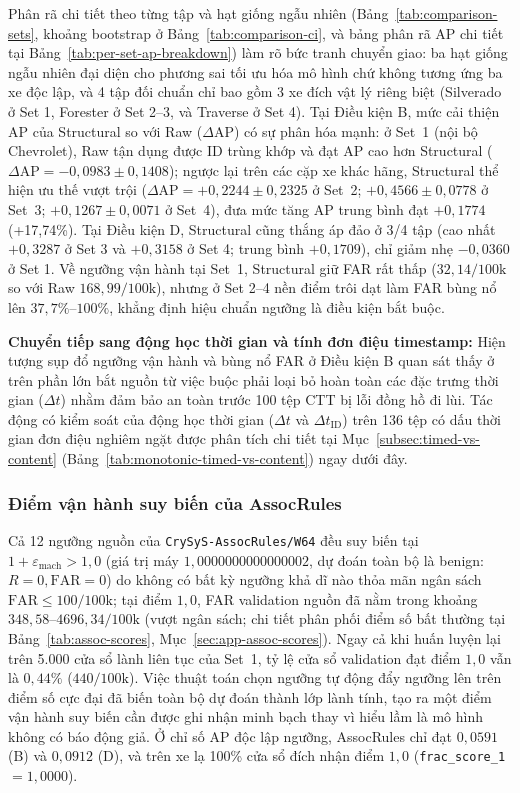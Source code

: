 \documentclass[12pt, a4paper, reqno, oneside]{book}
\DeclareRobustCommand{\code}[1]{\nolinkurl{#1}}
\begin{document}
Phân rã chi tiết theo từng tập và hạt giống ngẫu nhiên (Bảng~\ref{tab:comparison-sets}, khoảng bootstrap ở Bảng~\ref{tab:comparison-ci}, và bảng phân rã AP chi tiết tại Bảng~\ref{tab:per-set-ap-breakdown}) làm rõ bức tranh chuyển giao: ba hạt giống ngẫu nhiên đại diện cho phương sai tối ưu hóa mô hình chứ không tương ứng ba xe độc lập, và 4 tập đối chuẩn chỉ bao gồm 3 xe đích vật lý riêng biệt (Silverado ở Set 1, Forester ở Set 2--3, và Traverse ở Set 4). Tại Điều kiện B, mức cải thiện AP của Structural so với Raw ($\Delta\text{AP}$) có sự phân hóa mạnh: ở Set~1 (nội bộ Chevrolet), Raw tận dụng được ID trùng khớp và đạt AP cao hơn Structural ($\Delta\text{AP} = -0{,}0983 \pm 0{,}1408$); ngược lại trên các cặp xe khác hãng, Structural thể hiện ưu thế vượt trội ($\Delta\text{AP} = +0{,}2244 \pm 0{,}2325$ ở Set~2; $+0{,}4566 \pm 0{,}0778$ ở Set~3; $+0{,}1267 \pm 0{,}0071$ ở Set~4), đưa mức tăng AP trung bình đạt $+0{,}1774$ (+17,74\%). Tại Điều kiện D, Structural cũng thắng áp đảo ở 3/4 tập (cao nhất $+0{,}3287$ ở Set 3 và $+0{,}3158$ ở Set 4; trung bình $+0{,}1709$), chỉ giảm nhẹ $-0{,}0360$ ở Set 1. Về ngưỡng vận hành tại Set~1, Structural giữ FAR rất thấp ($32{,}14/100\text{k}$ so với Raw $168{,}99/100\text{k}$), nhưng ở Set 2--4 nền điểm trôi dạt làm FAR bùng nổ lên $37{,}7\%\text{--}100\%$, khẳng định hiệu chuẩn ngưỡng là điều kiện bắt buộc.

\noindent\textbf{Chuyển tiếp sang động học thời gian và tính đơn điệu timestamp:} Hiện tượng sụp đổ ngưỡng vận hành và bùng nổ FAR ở Điều kiện B quan sát thấy ở trên phần lớn bắt nguồn từ việc buộc phải loại bỏ hoàn toàn các đặc trưng thời gian ($\Delta t$) nhằm đảm bảo an toàn trước 100 tệp CTT bị lỗi đồng hồ đi lùi. Tác động có kiểm soát của động học thời gian ($\Delta t$ và $\Delta t_{\text{ID}}$) trên 136 tệp có dấu thời gian đơn điệu nghiêm ngặt được phân tích chi tiết tại Mục~\ref{subsec:timed-vs-content} (Bảng~\ref{tab:monotonic-timed-vs-content}) ngay dưới đây.

\subsubsection{Điểm vận hành suy biến của AssocRules}\label{subsec:assoc-degenerate}
Cả 12 ngưỡng nguồn của \code{CrySyS-AssocRules/W64} đều suy biến tại $1 + \varepsilon_{\text{mach}} > 1{,}0$ (giá trị máy $1{,}0000000000000002$, dự đoán toàn bộ là benign: $R=0, \text{FAR}=0$) do không có bất kỳ ngưỡng khả dĩ nào thỏa mãn ngân sách $\text{FAR} \le 100/100\text{k}$; tại điểm $1{,}0$, FAR validation nguồn đã nằm trong khoảng $348{,}58\text{--}4696{,}34/100\text{k}$ (vượt ngân sách; chi tiết phân phối điểm số bất thường tại Bảng~\ref{tab:assoc-scores}, Mục~\ref{sec:app-assoc-scores}). Ngay cả khi huấn luyện lại trên 5.000 cửa sổ lành liên tục của Set~1, tỷ lệ cửa sổ validation đạt điểm $1{,}0$ vẫn là $0{,}44\%$ ($440/100\text{k}$). Việc thuật toán chọn ngưỡng tự động đẩy ngưỡng lên trên điểm số cực đại đã biến toàn bộ dự đoán thành lớp lành tính, tạo ra một điểm vận hành suy biến cần được ghi nhận minh bạch thay vì hiểu lầm là mô hình không có báo động giả. Ở chỉ số AP độc lập ngưỡng, AssocRules chỉ đạt $0{,}0591$ (B) và $0{,}0912$ (D), và trên xe lạ 100\% cửa sổ đích nhận điểm $1{,}0$ (\code{frac\_score\_1} $=1{,}0000$).
\end{document}
